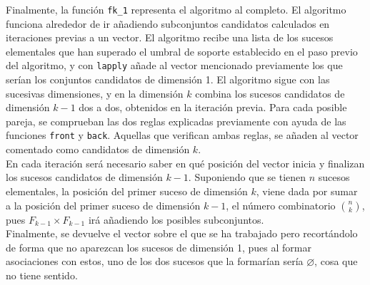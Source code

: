 \documentclass[12pt]{report}\usepackage[]{graphicx}\usepackage[dvipsnames]{xcolor}
\begin{document}
			Finalmente, la función \texttt{fk\_1} representa el algoritmo al completo. El algoritmo funciona alrededor de ir añadiendo subconjuntos candidatos calculados en iteraciones previas a un vector. El algoritmo recibe una lista de los sucesos elementales que han superado el umbral de soporte establecido en el paso previo del algoritmo, y con \texttt{lapply} añade al vector mencionado previamente los que serían los conjuntos candidatos de dimensión 1. El algoritmo sigue con las sucesivas dimensiones, y en la dimensión $k$ combina los sucesos candidatos de dimensión $k-1$ dos a dos, obtenidos en la iteración previa. Para cada posible pareja, se comprueban las dos reglas explicadas previamente con ayuda de las funciones \texttt{front} y \texttt{back}. Aquellas que verifican ambas reglas, se añaden al vector comentado como candidatos de dimensión $k$. \\
			
			En cada iteración será necesario saber en qué posición del vector inicia y finalizan los sucesos candidatos de dimensión $k-1$. Suponiendo que se tienen $n$ sucesos elementales, la posición del primer suceso de dimensión $k$, viene dada por sumar a la posición del primer suceso de dimensión $k-1$, el número combinatorio $\binom{n}{k}$, pues $F_{k-1} \times F_{k-1}$ irá añadiendo los posibles subconjuntos. \\
			
			Finalmente, se devuelve el vector sobre el que se ha trabajado pero recortándolo de forma que no aparezcan los sucesos de dimensión 1, pues al formar asociaciones con estos, uno de los dos sucesos que la formarían sería $\varnothing$, cosa que no tiene sentido. 
			
\end{document}
